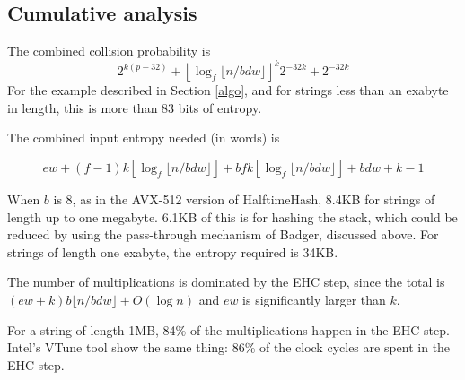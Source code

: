 \documentclass[runningheads]{llncs}
\begin{document}

\subsection{Cumulative analysis}

The combined collision probability is
\[2^{k(p-32)} + \left\lfloor \log_f \lfloor n / b d w \rfloor \right\rfloor^k 2^{-32k} + 2^{-32k}\]
For the example described in Section \ref{algo}, and for strings less than an exabyte in length, this is more than 83 bits of entropy.

The combined input entropy needed (in words) is

\[
e w
+ (f-1) k \left\lfloor\log_f \lfloor n/b d w\rfloor\right\rfloor
+ b f k \left\lfloor\log_f \lfloor n/b d w\rfloor\right\rfloor
+ b d w + k - 1
\]

When $b$ is 8, as in the AVX-512 version of HalftimeHash, 8.4KB for strings of length up to one megabyte.
6.1KB of this is for hashing the stack, which could be reduced by using the pass-through mechanism of Badger, discussed above.
For strings of length one exabyte, the entropy required is 34KB.

The number of multiplications is dominated by the EHC step, since the total is $(e w + k) b \lfloor n / b d w \rfloor + O(\log n)$ and $e w$ is significantly larger than $k$.

For a string of length 1MB, 84\% of the multiplications happen in the EHC step. %
Intel's VTune tool show the same thing: 86\% of the clock cycles are spent in the EHC step.

\end{document}
